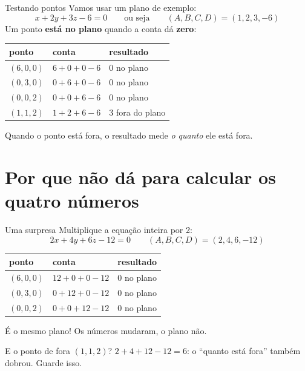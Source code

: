 \documentclass[aspectratio=169,11pt]{beamer}
\newcommand{\bnum}[1]{\textbf{\textcolor{mTeal}{#1}}}
\begin{document}
\begin{frame}{Testando pontos}
  Vamos usar um plano de exemplo:
  \[ x + 2y + 3z - 6 = 0 \qquad\text{ou seja}\qquad (A, B, C, D) = (1, 2, 3, -6) \]
  Um ponto \bnum{está no plano} quando a conta dá \bnum{zero}:
  \begin{center}
  \renewcommand{\arraystretch}{1.12}
  \begin{tabular}{lll}
    \toprule
    ponto & conta & resultado \\
    \midrule
    $(6, 0, 0)$ & $6 + 0 + 0 - 6$ & $0$ \quad \textcolor{mTeal}{no plano} \\
    $(0, 3, 0)$ & $0 + 6 + 0 - 6$ & $0$ \quad \textcolor{mTeal}{no plano} \\
    $(0, 0, 2)$ & $0 + 0 + 6 - 6$ & $0$ \quad \textcolor{mTeal}{no plano} \\
    $(1, 1, 2)$ & $1 + 2 + 6 - 6$ & $3$ \quad \textcolor{mRose}{fora do plano} \\
    \bottomrule
  \end{tabular}
  \end{center}
  Quando o ponto está fora, o resultado mede \emph{o quanto} ele está fora.
\end{frame}

\section{Por que não dá para calcular os quatro números}

\begin{frame}{Uma surpresa}
  Multiplique a equação inteira por 2:
  \[ 2x + 4y + 6z - 12 = 0 \qquad (A, B, C, D) = (2, 4, 6, -12) \]
  \pause
  {\centering\small
  \renewcommand{\arraystretch}{1.05}
  \begin{tabular}{lll}
    \toprule
    ponto & conta & resultado \\
    \midrule
    $(6, 0, 0)$ & $12 + 0 + 0 - 12$ & $0$ \quad \textcolor{mTeal}{no plano} \\
    $(0, 3, 0)$ & $0 + 12 + 0 - 12$ & $0$ \quad \textcolor{mTeal}{no plano} \\
    $(0, 0, 2)$ & $0 + 0 + 12 - 12$ & $0$ \quad \textcolor{mTeal}{no plano} \\
    \bottomrule
  \end{tabular}\par}
  \medskip
  \alert{É o mesmo plano!} Os números mudaram, o plano não.
  \pause

  E o ponto de fora $(1, 1, 2)$? \;$2 + 4 + 12 - 12 = 6$: o ``quanto está fora''
  \alert{também dobrou}. Guarde isso.
\end{frame}
\end{document}
